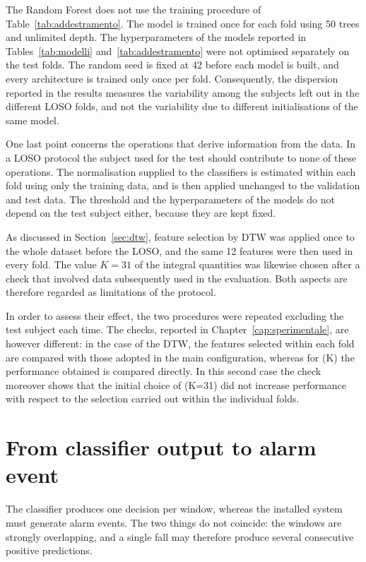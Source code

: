 The Random Forest does not use the training procedure of Table~\ref{tab:addestramento}. The model is trained once for each fold using 50 trees and unlimited depth.
The hyperparameters of the models reported in Tables~\ref{tab:modelli} and~\ref{tab:addestramento} were not optimised separately on the test folds. The random seed is fixed at 42 before each model is built, and every architecture is trained only once per fold. Consequently, the dispersion reported in the results measures the variability among the subjects left out in the different LOSO folds, and not the variability due to different initialisations of the same model.

One last point concerns the operations that derive information from the data. In a LOSO protocol the subject used for the test should contribute to none of these operations.
The normalisation supplied to the classifiers is estimated within each fold using only the training data, and is then applied unchanged to the validation and test data. The threshold and the hyperparameters of the models do not depend on the test subject either, because they are kept fixed.

As discussed in Section~\ref{sec:dtw}, feature selection by DTW was applied once to the whole dataset before the LOSO, and the same 12 features were then used in every fold. The value \(K=31\) of the integral quantities was likewise chosen after a check that involved data subsequently used in the evaluation. Both aspects are therefore regarded as limitations of the protocol.

In order to assess their effect, the two procedures were repeated excluding the test subject each time. The checks, reported in Chapter~\ref{cap:sperimentale}, are however different: in the case of the DTW, the features selected within each fold are compared with those adopted in the main configuration, whereas for (K) the performance obtained is compared directly. In this second case the check moreover shows that the initial choice of (K=31) did not increase performance with respect to the selection carried out within the individual folds.

\section{From classifier output to alarm event}
\label{sec:allarme}

The classifier produces one decision per window, whereas the installed system must generate alarm events. The two things do not coincide: the windows are strongly overlapping, and a single fall may therefore produce several consecutive positive predictions.

